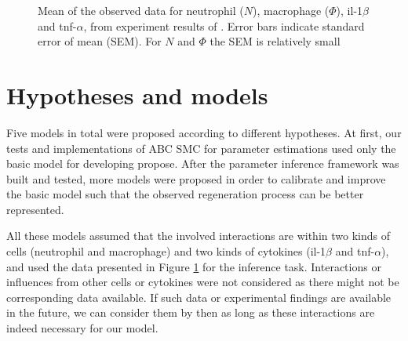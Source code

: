 \begin{figure}
    \begin{center}
    \end{center}

    \caption[Mean of the observed data]%
    {Mean of the observed data for neutrophil ($N$), macrophage ($\Phi$), il-1$\beta$ and tnf-$\alpha$, from experiment results of \cite{ref:Tsarouchas}. Error bars indicate standard error of mean (SEM). For $N$ and $\Phi$ the SEM is relatively small}
    \label{fig:obs_data}

\end{figure}

\section{Hypotheses and models}

Five models in total were proposed according to different hypotheses. At first, our tests and implementations of ABC SMC for parameter estimations used only the basic model for developing propose. After the parameter inference framework was built and tested, more models were proposed in order to calibrate and improve the basic model such that the observed regeneration process can be better represented.

All these models assumed that the involved interactions are within two kinds of cells (neutrophil and macrophage) and two kinds of cytokines (il-1$\beta$ and tnf-$\alpha$), and used the data presented in Figure \ref{fig:obs_data} for the inference task. Interactions or influences from other cells or cytokines were not considered as there might not be corresponding data available. If such data or experimental findings are available in the future, we can consider them by then as long as these interactions are indeed necessary for our model.

